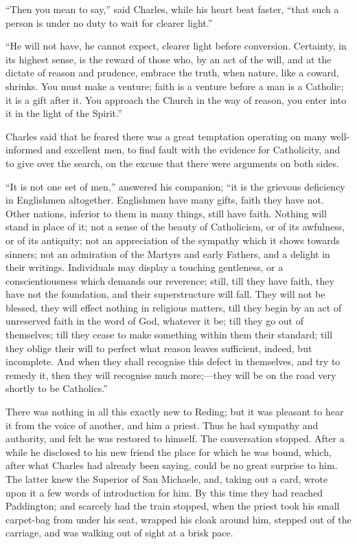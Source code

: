 ``Then you mean to say,'' said Charles, while his heart
beat faster, ``that such a person is under no duty to wait for
clearer light.''

``He will not have, he cannot expect, clearer light before
conversion. Certainty, in its highest sense, is the reward of those
who, by an act of the will, and at the dictate of reason and prudence,
embrace the truth, when nature, like a coward, shrinks. You must make
a venture; faith is a venture before a man is a Catholic; it is a gift
after it. You approach the Church in the way of reason, you enter into
it in the light of the Spirit.''

Charles said that he feared there was a great temptation operating
on many well-informed and excellent men, to find fault with the
evidence for Catholicity, and to give over the search, on the excuse
that there were arguments on both sides.

``It is not one set of men,'' answered his companion;
``it is the grievous deficiency in Englishmen altogether.
Englishmen have many gifts, faith they have not. Other nations,
inferior to them in many things, still have faith. Nothing will stand
in place of it; not a sense of the beauty of Catholicism, or of its
awfulness, or of its antiquity; not an appreciation of the sympathy
which it shows towards sinners; not an admiration of the Martyrs and
early Fathers, and a delight in their writings. Individuals may
display a touching gentleness, or a conscientiousness which demands
our reverence; still, till they have faith, they have not the
foundation, and their superstructure will fall. They will not be
blessed, they will effect nothing in religious matters, till they
begin by an act of unreserved faith in the word of God, whatever it
be; till they go out of themselves; till they cease to make something
within them their standard; till they oblige their will to perfect
what reason leaves sufficient, indeed, but incomplete. And when they
shall recognise this defect in themselves, and try to remedy it, then
they will recognise much more;—they will be on the road very shortly
to be Catholics.''

There was nothing in all this exactly new to Reding; but it was
pleasant to hear it from the voice of another, and him a priest. Thus
he had sympathy and authority, and felt he was restored to himself.
The conversation stopped. After a while he disclosed to his new friend
the place for which he was bound, which, after what Charles had
already been saying, could be no great surprise to him. The latter
knew the Superior of San Michaele, and, taking out a card, wrote upon
it a few words of introduction for him. By this time they had reached
Paddington; and scarcely had the train stopped, when the priest took
his small carpet-bag from under his seat, wrapped his cloak around
him, stepped out of the carriage, and was walking out of sight at a
brisk pace.

